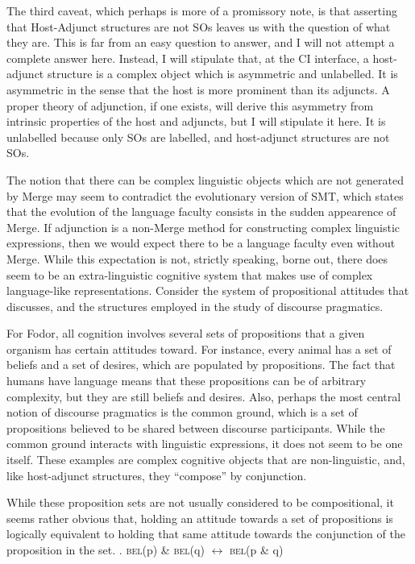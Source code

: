 \documentclass[MilwayThesis]{subfiles}
\begin{document}
The third caveat, which perhaps is more of a promissory note, is that asserting that Host-Adjunct structures are not SOs leaves us with the question of what they are.
This is far from an easy question to answer, and I will not attempt a complete answer here.
Instead, I will stipulate that, at the CI interface, a host-adjunct structure is a complex object which is asymmetric and unlabelled.
It is asymmetric in the sense that the host is more prominent than its adjuncts.
A proper theory of adjunction, if one exists, will derive this asymmetry from intrinsic properties of the host and adjuncts, but I will stipulate it here.
It is unlabelled because only SOs are labelled, and host-adjunct structures are not SOs.

The notion that there can be complex linguistic objects which are not generated by Merge may seem to contradict the evolutionary version of SMT, which states that the evolution of the language faculty consists in the sudden appearence of Merge.
If adjunction is a non-Merge method for constructing complex linguistic expressions, then we would expect there to be a language faculty even without Merge.
While this expectation is not, strictly speaking, borne out, there does seem to be an extra-linguistic cognitive system that makes use of complex language-like representations.
Consider the system of propositional attitudes that \textcite{fodor1975language} discusses, and the structures employed in the study of discourse pragmatics.

For Fodor, all cognition involves several sets of propositions that a given organism has certain attitudes toward.
For instance, every animal has a set of beliefs and a set of desires, which are populated by propositions.
The fact that humans have language means that these propositions can be of arbitrary complexity, but they are still beliefs and desires.
Also, perhaps the most central notion of discourse pragmatics is the common ground, which is a set of propositions believed to be shared between discourse participants.
While the common ground interacts with linguistic expressions, it does not seem to be one itself.
These examples are complex cognitive objects that are non-linguistic, and, like host-adjunct structures, they ``compose'' by conjunction.

While these proposition sets are not usually considered to be compositional, it seems rather obvious that, holding an attitude towards a set of propositions is logically equivalent to holding that same attitude towards the conjunction of the proposition in the set.
\ex. \textsc{bel}(p) \& \textsc{bel}(q) $\leftrightarrow$ \textsc{bel}(p \& q)
\end{document}
